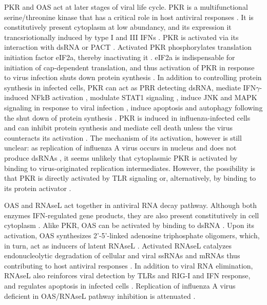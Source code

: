 		\gls{PKR} and \gls{OAS} act at later stages of viral life cycle. \gls{PKR} is a multifunctional serine/threonine kinase that has a critical role in host antiviral responses \parencite{Garcia2006a}. It is constitutively present cytoplasm at low abundancy, and its expression it trancsriotionally induced by type I and III \gls{IFN}s \parencite{Meurs1990}. \gls{PKR} is activated via its interaction with dsRNA or \gls{PACT} \parencite{Li2006a}. Activated \gls{PKR} phosphorylates translation initiation factor \gls{eIF2a}, thereby inactivating it \parencite{Levin1978}. \gls{eIF2a} is indispensable for initiation of cap-dependent translation, and thus activation of \gls{PKR} in response to virus infection shuts down protein synthesis \parencite{Kimball1999}. In addition to controlling protein synthesis in infected cells, \gls{PKR} can act as \gls{PRR} detecting dsRNA, mediate \gls{IFN}$\gamma$-induced \gls{NFkB} activation \parencite{Deb2001}, modulate \gls{STAT}1 signaling \parencite{Wong1997}, induce \gls{JNK} and \gls{MAPK} signaling in response to viral infection \parencite{Chu1999}, induce apoptosis and autophagy following the shut down of protein synthesis \parencite{Gil2000, Talloczy2002}. \gls{PKR} is induced in influenza-infected cells and can inhibit protein synthesis and mediate cell death unless the virus counteracts its activation \parencite{Takizawa1996, Hatada1999}.  The mechanism of its activation, however is still unclear: as replication of influenza A virus occurs in nucleus and does not produce dsRNAs \parencite{Wisskirchen2011}, it seems unlikely that cytoplasmic \gls{PKR} is activated by binding to virus-originated replication intermediates. However, the possibility is that \gls{PKR} is directly activated by \gls{TLR} signaling \parencite{Jiang2003} or, alternatively, by binding to its protein activator \parencite{Garcia2006a}.
		
		\gls{OAS} and \gls{RNAseL} act together in antiviral RNA decay pathway. Although both enzymes \gls{IFN}-regulated gene products, they are also present constitutively in cell cytoplasm \parencite{Sadler2008}. Alike \gls{PKR}, \gls{OAS} can be activated by binding to dsRNA \parencite{Castelli1998}. Upon its activation, \gls{OAS} synthesizes 2'-5'-linked adenosine triphosphate oligomers, which, in turn, act as inducers of latent \gls{RNAseL} \parencite{Rebouillat1999}. Activated \gls{RNAseL} catalyzes endonucleolytic degradation of cellular and viral ssRNAs and mRNAs thus contributing to host antiviral responses \parencite{Dyer2006}. In addition to viral RNA elimination, \gls{RNAseL} also reinforces viral detection by \gls{TLR}s and \gls{RIG-I} and \gls{IFN} response, and regulates apoptosis in infected cells \parencite{Liang2006}. Replication of influenza A virus deficient in \gls{OAS}/\gls{RNAseL} pathway inhibition is attenuated \parencite{Min2006}.
		
